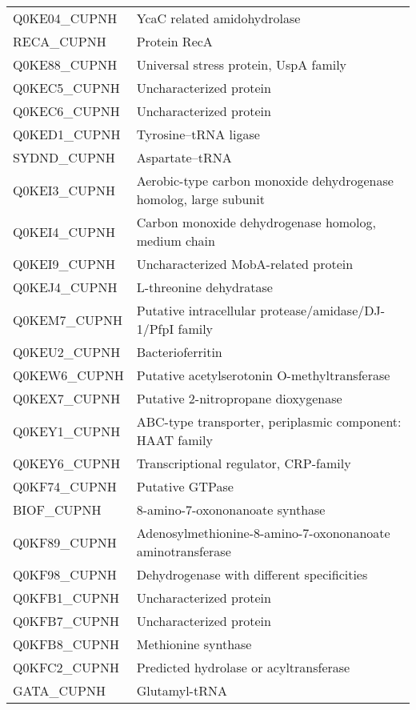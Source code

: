 \begin{center}
\begin{longtable}{ l l }
Q0KE04\_CUPNH & YcaC related amidohydrolase \\ [0.5ex]
RECA\_CUPNH & Protein RecA \\ [0.5ex]
Q0KE88\_CUPNH & Universal stress protein, UspA family \\ [0.5ex]
Q0KEC5\_CUPNH & Uncharacterized protein \\ [0.5ex]
Q0KEC6\_CUPNH & Uncharacterized protein \\ [0.5ex]
Q0KED1\_CUPNH & Tyrosine--tRNA ligase \\ [0.5ex]
SYDND\_CUPNH & Aspartate--tRNA \\ [0.5ex]
Q0KEI3\_CUPNH & Aerobic-type carbon monoxide dehydrogenase homolog, large subunit \\ [0.5ex]
Q0KEI4\_CUPNH & Carbon monoxide dehydrogenase homolog, medium chain \\ [0.5ex]
Q0KEI9\_CUPNH & Uncharacterized MobA-related protein \\ [0.5ex]
Q0KEJ4\_CUPNH & L-threonine dehydratase \\ [0.5ex]
Q0KEM7\_CUPNH & Putative intracellular protease/amidase/DJ-1/PfpI family \\ [0.5ex]
Q0KEU2\_CUPNH & Bacterioferritin \\ [0.5ex]
Q0KEW6\_CUPNH & Putative acetylserotonin O-methyltransferase \\ [0.5ex]
Q0KEX7\_CUPNH & Putative 2-nitropropane dioxygenase \\ [0.5ex]
Q0KEY1\_CUPNH & ABC-type transporter, periplasmic component: HAAT family \\ [0.5ex]
Q0KEY6\_CUPNH & Transcriptional regulator, CRP-family \\ [0.5ex]
Q0KF74\_CUPNH & Putative GTPase \\ [0.5ex]
BIOF\_CUPNH & 8-amino-7-oxononanoate synthase \\ [0.5ex]
Q0KF89\_CUPNH & Adenosylmethionine-8-amino-7-oxononanoate aminotransferase \\ [0.5ex]
Q0KF98\_CUPNH & Dehydrogenase with different specificities \\ [0.5ex]
Q0KFB1\_CUPNH & Uncharacterized protein \\ [0.5ex]
Q0KFB7\_CUPNH & Uncharacterized protein \\ [0.5ex]
Q0KFB8\_CUPNH & Methionine synthase \\ [0.5ex]
Q0KFC2\_CUPNH & Predicted hydrolase or acyltransferase \\ [0.5ex]
GATA\_CUPNH & Glutamyl-tRNA \\ [0.5ex]

\end{longtable}
\end{center}
